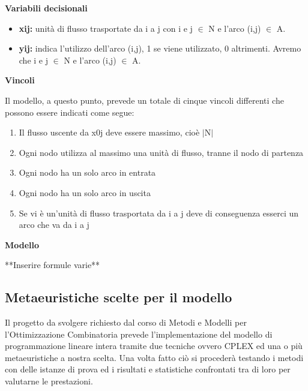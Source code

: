 \documentclass[preprint,12pt]{elsarticle}
\begin{document}
\begin{large}
\textbf{Variabili decisionali}
\end{large}

\begin{itemize}
\item \textbf{x{\tiny ij}:} unità di flusso trasportate da i a j con i e j  $\in$ N e l'arco (i,j) $\in$ A.
\item \textbf{y{\tiny ij}:} indica l'utilizzo dell'arco (i,j), 1 se viene utilizzato, 0 altrimenti. Avremo che i e j  $\in$ N e l'arco (i,j) $\in$ A.\\

\end{itemize}

\begin{large}
\textbf{Vincoli\\}
\end{large}

Il modello, a questo punto, prevede un totale di cinque vincoli differenti che possono essere indicati come segue:


\begin{enumerate}
\item Il flusso uscente da x{\tiny 0j} deve essere massimo, cioè $\mid$N$\mid$
\item Ogni nodo utilizza al massimo una unità di flusso, tranne il nodo di partenza
\item Ogni nodo ha un solo arco in entrata
\item Ogni nodo ha un solo arco in uscita
\item Se vi è un'unità di flusso trasportata da i a j deve di conseguenza esserci un arco che va da i a j\\
\end{enumerate}

\begin{large}
\textbf{Modello\\}
\end{large}
**Inserire formule varie**

\subsection{Metaeuristiche scelte per il modello}

Il progetto da svolgere richiesto dal corso di Metodi e Modelli per l'Ottimizzazione Combinatoria prevede l'implementazione del modello di programmazione lineare intera tramite due tecniche ovvero CPLEX ed una o più metaeuristiche a nostra scelta. Una volta fatto ciò si procederà testando i metodi con delle istanze di prova ed i risultati e statistiche confrontati tra di loro per valutarne le prestazioni.
\end{document}

